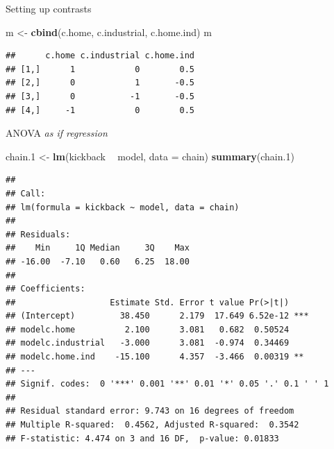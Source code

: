 \documentclass[
  ignorenonframetext,
]{beamer}
\newenvironment{Shaded}{\begin{snugshade}}{\end{snugshade}}
\newcommand{\DataTypeTok}[1]{\textcolor[rgb]{0.13,0.29,0.53}{#1}}
\newcommand{\FloatTok}[1]{\textcolor[rgb]{0.00,0.00,0.81}{#1}}
\newcommand{\KeywordTok}[1]{\textcolor[rgb]{0.13,0.29,0.53}{\textbf{#1}}}
\newcommand{\NormalTok}[1]{#1}
\newcommand{\OperatorTok}[1]{\textcolor[rgb]{0.81,0.36,0.00}{\textbf{#1}}}
\newcommand{\StringTok}[1]{\textcolor[rgb]{0.31,0.60,0.02}{#1}}
\begin{document}
\begin{frame}[fragile]{Setting up contrasts}
\protect\hypertarget{setting-up-contrasts}{}

\begin{Shaded}
\begin{Highlighting}[]
\NormalTok{m <-}\StringTok{ }\KeywordTok{cbind}\NormalTok{(c.home, c.industrial, c.home.ind)}
\NormalTok{m}
\end{Highlighting}
\end{Shaded}

\begin{verbatim}
##      c.home c.industrial c.home.ind
## [1,]      1            0        0.5
## [2,]      0            1       -0.5
## [3,]      0           -1       -0.5
## [4,]     -1            0        0.5
\end{verbatim}

\begin{Shaded}
\end{Shaded}

\end{frame}

\begin{frame}[fragile]{ANOVA \emph{as if regression}}
\protect\hypertarget{anova-as-if-regression}{}

\scriptsize

\begin{Shaded}
\begin{Highlighting}[]
\NormalTok{chain}\FloatTok{.1}\NormalTok{ <-}\StringTok{ }\KeywordTok{lm}\NormalTok{(kickback }\OperatorTok{~}\StringTok{ }\NormalTok{model, }\DataTypeTok{data =}\NormalTok{ chain)}
\KeywordTok{summary}\NormalTok{(chain}\FloatTok{.1}\NormalTok{)}
\end{Highlighting}
\end{Shaded}

\begin{verbatim}
## 
## Call:
## lm(formula = kickback ~ model, data = chain)
## 
## Residuals:
##    Min     1Q Median     3Q    Max 
## -16.00  -7.10   0.60   6.25  18.00 
## 
## Coefficients:
##                   Estimate Std. Error t value Pr(>|t|)    
## (Intercept)         38.450      2.179  17.649 6.52e-12 ***
## modelc.home          2.100      3.081   0.682  0.50524    
## modelc.industrial   -3.000      3.081  -0.974  0.34469    
## modelc.home.ind    -15.100      4.357  -3.466  0.00319 ** 
## ---
## Signif. codes:  0 '***' 0.001 '**' 0.01 '*' 0.05 '.' 0.1 ' ' 1
## 
## Residual standard error: 9.743 on 16 degrees of freedom
## Multiple R-squared:  0.4562, Adjusted R-squared:  0.3542 
## F-statistic: 4.474 on 3 and 16 DF,  p-value: 0.01833
\end{verbatim}

\normalsize

\end{frame}
\end{document}
